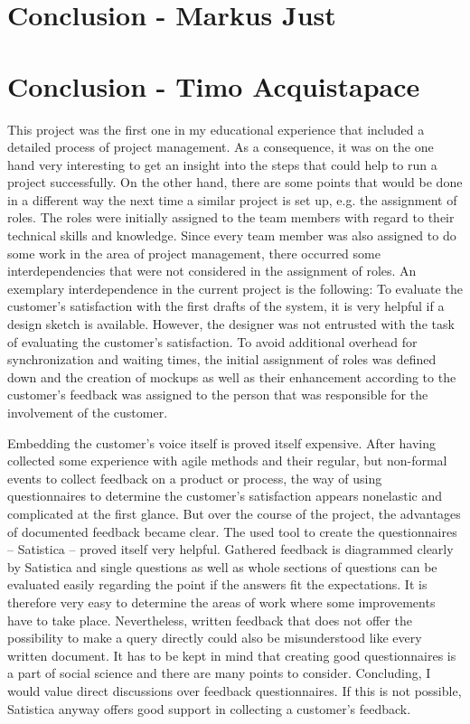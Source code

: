 \section{Conclusion - Markus Just}

\section{Conclusion - Timo Acquistapace}
This project was the first one in my educational experience that included a
detailed process of project management. As a consequence, it was on the one hand
very interesting to get an insight into the steps that could help to run a
project successfully. On the other hand, there are some points that would be
done in a different way the next time a similar project is set up, e.g. the
assignment of roles. The roles were initially assigned to the team members with
regard to their technical skills and knowledge.  Since every team member was
also assigned to do some work in the area of project management, there occurred
some interdependencies that were not considered in the assignment of roles. An
exemplary interdependence in the current project is the following: To evaluate
the customer's satisfaction with the first drafts of the system, it is very
helpful if a design sketch is available. However, the designer was not entrusted
with the task of evaluating the customer's satisfaction. To avoid additional
overhead for synchronization and waiting times, the initial assignment of roles
was defined down and the creation of mockups as well as their enhancement
according to the customer's feedback was assigned to the person that was
responsible for the involvement of the customer.

Embedding the customer's voice itself is proved itself expensive. After having
collected some experience with agile methods and their regular, but non-formal
events to collect feedback on a product or process, the way of using
questionnaires to determine the customer's satisfaction appears nonelastic and
complicated at the first glance. But over the course of the project, the
advantages of documented feedback became clear. The used tool to create the
questionnaires -- Satistica -- proved itself very helpful. Gathered feedback is
diagrammed clearly by Satistica and single questions as well as whole sections
of questions can be evaluated easily regarding the point if the answers fit the
expectations. It is therefore very easy to determine the areas of work where
some improvements have to take place. Nevertheless, written feedback that does
not offer the possibility to make a query directly could also be misunderstood
like every written document. It has to be kept in mind that creating good
questionnaires is a part of social science and there are many points to
consider. Concluding, I would value direct discussions over feedback
questionnaires. If this is not possible, Satistica anyway offers good support in
collecting a customer's feedback.


